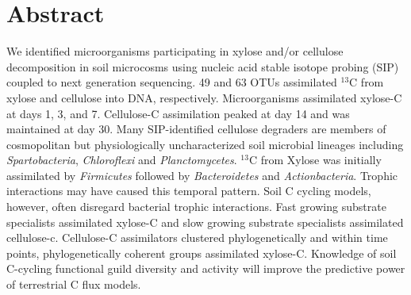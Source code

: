 \section{Abstract} We identified microorganisms participating in xylose and/or
cellulose decomposition in soil microcosms using nucleic acid stable isotope
probing (SIP) coupled to next generation sequencing. 49 and 63
OTUs assimilated $^{13}$C from xylose and cellulose into DNA, respectively.
Microorganisms assimilated xylose-C at days 1, 3, and 7. Cellulose-C
assimilation peaked at day 14 and was maintained at day 30. Many SIP-identified
cellulose degraders are members of cosmopolitan but physiologically
uncharacterized soil microbial lineages including \textit{Spartobacteria},
\textit{Chloroflexi} and \textit{Planctomycetes}. $^{13}$C from Xylose was
initially assimilated by \textit{Firmicutes} followed by \textit{Bacteroidetes}
and \textit{Actionbacteria}. Trophic interactions may have caused this temporal
pattern. Soil C cycling models, however, often disregard bacterial trophic
interactions. Fast growing substrate specialists assimilated xylose-C and slow
growing substrate specialists assimilated cellulose-c. Cellulose-C assimilators
clustered phylogenetically and within time points, phylogenetically coherent
groups assimilated xylose-C. Knowledge of soil C-cycling functional guild
diversity and activity will improve the predictive power of terrestrial C flux
models. 
